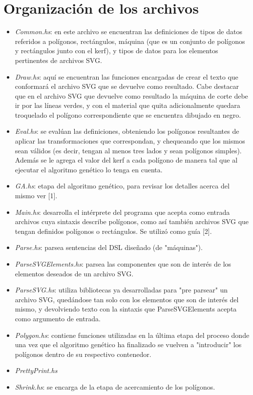 \documentclass[a4paper,10pt]{article}
\begin{document}
\section*{Organización de los archivos}
\begin{itemize}
    \item \textit{Common.hs}: en este archivo se encuentran las definiciones de tipos de datos referidos a
    polígonos, rectángulos, máquina (que es un conjunto de polígonos y rectángulos junto con el kerf), y tipos
    de datos para los elementos pertinentes de archivos SVG.
    \item \textit{Draw.hs}: aquí se encuentran las funciones encargadas de crear el texto que conformará el
    archivo SVG que se devuelve como resultado. Cabe destacar que en el archivo SVG que devuelve como
    resultado la máquina de corte debe ir por las líneas verdes, y con el material que quita adicionalmente
    quedara troquelado el polígono correspondiente que se encuentra dibujado en negro.
    \item \textit{Eval.hs}: se evalúan las definiciones, obteniendo los polígonos resultantes de aplicar las
    transformaciones que correspondan, y chequeando que los mismos sean válidos (es decir, tengan al menos
    tres lados y sean polígonos simples). Además se le agrega el valor del kerf a cada polígono de manera tal
    que al ejecutar el algoritmo genético lo tenga en cuenta.
    \item \textit{GA.hs}: etapa del algoritmo genético, para revisar los detalles acerca del mismo ver [1].
    \item \textit{Main.hs}: desarrolla el intérprete del programa que acepta como entrada archivos cuya
    sintaxis describe polígonos, como así también archivos SVG que tengan definidos polígonos o rectángulos.
    Se utilizó como guía [2].
    \item \textit{Parse.hs}: parsea sentencias del DSL diseñado (de "máquinas").
    \item \textit{ParseSVGElements.hs}: parsea las componentes que son de interés de los elementos deseados de
    un archivo SVG.
    \item \textit{ParseSVG.hs}: utiliza bibliotecas ya desarrolladas para "pre parsear" un archivo SVG,
    quedándose tan solo con los elementos que son de interés del mismo, y devolviendo texto con la sintaxis
    que ParseSVGElements acepta como argumento de entrada.
    \item \textit{Polygon.hs}: contiene funciones utilizadas en la última etapa del proceso donde una vez que
    el algoritmo genético ha finalizado se vuelven a "introducir" los polígonos dentro de su respectivo
    contenedor.
    \item \textit{PrettyPrint.hs}
    \item \textit{Shrink.hs}: se encarga de la etapa de acercamiento de los polígonos.
\end{itemize}
\end{document}
